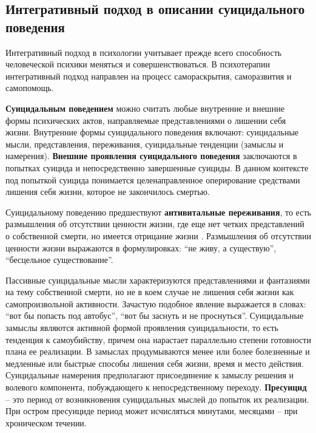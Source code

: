 \subsection{Интегративный подход в описании суицидального поведения}

Интегративный подход в психологии учитывает прежде всего способность человеческой психики меняться и совершенствоваться. В психотерапии интегративный подход направлен на процесс самораскрытия, саморазвития и самопомощь.\cite{integ}

\textbf{Суицидальным поведением} можно считать любые внутренние и внешние формы психических актов, направляемые представлениями о лишении себя жизни. Внутренние формы суицидального поведения включают: суицидальные мысли, представления, переживания, суицидальные тенденции (замыслы и намерения). \textbf{Внешние проявления суицидального поведения} заключаются в попытках суицида и непосредственно завершенные суициды. В данном контексте под попыткой суицида понимается целенаправленное оперирование средствами лишения себя жизни, которое не закончилось смертью. \cite{starsen}

Суицидальному поведению предшествуют \textbf{антивитальные переживания}, то есть размышления об отсутствии ценности жизни, где еще нет четких представлений о собственной смерти, но имеется отрицание жизни \cite{grishina}. Размышления об отсутствии ценности жизни выражаются в формулировках: ``не живу, а существую'', ``бесцельное существование''. \cite{starsen}

Пассивные суицидальные мысли характеризуются представлениями и фантазиями на тему собственной смерти, но не в коем случае не лишения себя жизни как самопроизвольной активности. Зачастую подобное явление выражается в словах: ``вот бы попасть под автобус'', ``вот бы заснуть и не проснуться''. Суицидальные замыслы являются активной формой проявления суицидальности, то есть тенденция к самоубийству, причем она нарастает параллельно степени готовности плана ее реализации. В замыслах продумываются менее или более болезненные и медленные или быстрые способы лишения себя жизни, время и место действия. Суицидальные намерения предполагают присоединение к замыслу решения и волевого компонента, побуждающего к непосредственному переходу. \textbf{Пресуицид} -- это период от возникновения суицидальных мыслей до попыток их реализации. При остром пресуициде период может исчисляться минутами, месяцами -- при хроническом течении. \cite{starsen}

